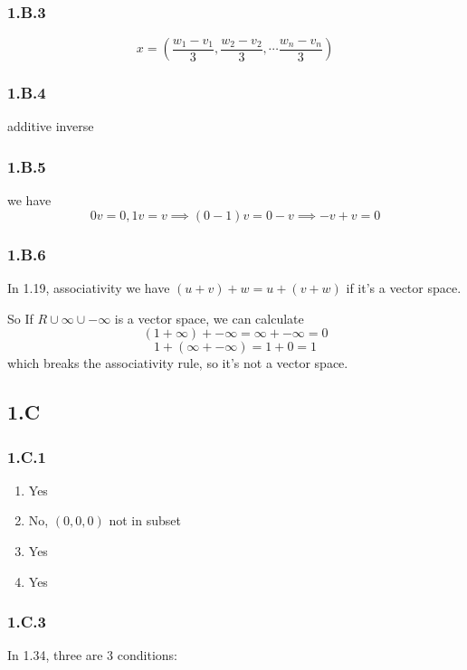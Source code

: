\subsubsection*{1.B.3}
\begin{equation*}
    x = (\frac{w_1 - v_1}{3}, \frac{w_2-v_2}{3}, \cdots \frac{w_n-v_n}{3})
\end{equation*}

\subsubsection*{1.B.4}
additive inverse

\subsubsection*{1.B.5}
we have
\begin{equation*}
    0v = 0, 1v = v \implies    (0-1)v = 0 - v \implies -v + v = 0
\end{equation*}

\subsubsection*{1.B.6}
In 1.19, associativity we have $(u+v)+w = u+(v+w)$ if it's a vector space.

So If $R \cup \infty \cup -\infty$ is a vector space, we can calculate
    \[ (1 + \infty) + -\infty = \infty + -\infty = 0 \]
    \[1 + (\infty + -\infty) = 1 + 0 = 1\]
which breaks the associativity rule, so it's not a vector space.


\subsection*{1.C}

\subsubsection*{1.C.1}
\begin{enumerate}[label=(\alph*)]
\item Yes
\item No, $(0, 0, 0)$ not in subset
\item Yes
\item Yes
\end{enumerate}

\subsubsection*{1.C.3}
In 1.34, three are 3 conditions:

